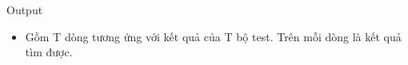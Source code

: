 Output  
\begin{itemize}
	\item     Gồm T dòng tương ứng với kết quả của T bộ test. Trên mỗi dòng là kết quả tìm được.   
\end{itemize}